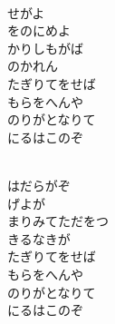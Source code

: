 \documentclass[10pt,b5j]{tarticle} %
\begin{document}
\vspace{1.5em} %
\newcommand{\linespace}{0.5em} %
\newcommand{\blocksize}{0.5\hsize} %
\newcommand{\itemmargin}{6em} %
\begin{enumerate} %
    \setlength{\itemindent}{\itemmargin} %
    \begin{minipage}[c]{\blocksize}
    
        \vspace{\linespace}
        \item~\\
        せがよ\\
        をのにめよ\\
        かりしもがば\\
        のかれん\\
        たぎりてをせば\\
        もらをへんや\\
        のりがとなりて\\
        にるはこのぞ
        
        \vspace{\linespace}
        \item~\\
        はだらがぞ\\
        げよが\\
        まりみてただをつ\\
        きるなきが\\
        たぎりてをせば\\
        もらをへんや\\
        のりがとなりて\\
        にるはこのぞ
        

\end{minipage}
\end{enumerate}
\end{document}
